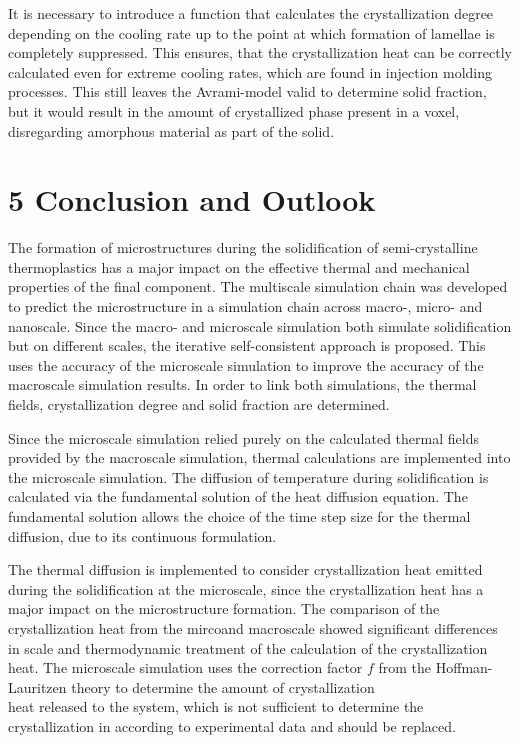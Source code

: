 \documentclass[10pt]{article}
\begin{document}
It is necessary to introduce a function that calculates the crystallization degree depending on the cooling rate up to the point at which formation of lamellae is completely suppressed. This ensures, that the crystallization heat can be correctly calculated even for extreme cooling rates, which are found in injection molding processes. This still leaves the Avrami-model valid to determine solid fraction, but it would result in the amount of crystallized phase present in a voxel, disregarding amorphous material as part of the solid.

\section*{5 Conclusion and Outlook}
The formation of microstructures during the solidification of semi-crystalline thermoplastics has a major impact on the effective thermal and mechanical properties of the final component. The multiscale simulation chain was developed to predict the microstructure in a simulation chain across macro-, micro- and nanoscale. Since the macro- and microscale simulation both simulate solidification but on different scales, the iterative self-consistent approach is proposed. This uses the accuracy of the microscale simulation to improve the accuracy of the macroscale simulation results. In order to link both simulations, the thermal fields, crystallization degree and solid fraction are determined.

Since the microscale simulation relied purely on the calculated thermal fields provided by the macroscale simulation, thermal calculations are implemented into the microscale simulation. The diffusion of temperature during solidification is calculated via the fundamental solution of the heat diffusion equation. The fundamental solution allows the choice of the time step size for the thermal diffusion, due to its continuous formulation.

The thermal diffusion is implemented to consider crystallization heat emitted during the solidification at the microscale, since the crystallization heat has a major impact on the microstructure formation. The comparison of the crystallization heat from the mircoand macroscale showed significant differences in scale and thermodynamic treatment of the calculation of the crystallization heat. The microscale simulation uses the correction factor $f$ from the Hoffman-Lauritzen theory to determine the amount of crystallization\\
heat released to the system, which is not sufficient to determine the crystallization in according to experimental data and should be replaced.
\end{document}
